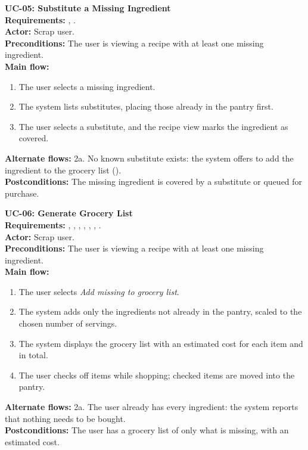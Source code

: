 \begin{sloppypar}
\medskip\noindent\textbf{UC-05: Substitute a Missing Ingredient}\\
\textbf{Requirements:} , .\\
\textbf{Actor:} Scrap user.\\
\textbf{Preconditions:} The user is viewing a recipe with at least one missing ingredient.\\
\textbf{Main flow:}
\begin{enumerate}
\item The user selects a missing ingredient.
\item The system lists substitutes, placing those already in the pantry first.
\item The user selects a substitute, and the recipe view marks the ingredient as covered.
\end{enumerate}
\textbf{Alternate flows:} 2a. No known substitute exists: the system offers to add the ingredient to the grocery list ().\\
\textbf{Postconditions:} The missing ingredient is covered by a substitute or queued for purchase.

\medskip\noindent\textbf{UC-06: Generate Grocery List}\\
\textbf{Requirements:} , , , , , , .\\
\textbf{Actor:} Scrap user.\\
\textbf{Preconditions:} The user is viewing a recipe with at least one missing ingredient.\\
\textbf{Main flow:}
\begin{enumerate}
\item The user selects \textit{Add missing to grocery list}.
\item The system adds only the ingredients not already in the pantry, scaled to the chosen number of servings.
\item The system displays the grocery list with an estimated cost for each item and in total.
\item The user checks off items while shopping; checked items are moved into the pantry.
\end{enumerate}
\textbf{Alternate flows:} 2a. The user already has every ingredient: the system reports that nothing needs to be bought.\\
\textbf{Postconditions:} The user has a grocery list of only what is missing, with an estimated cost.


\end{sloppypar}
